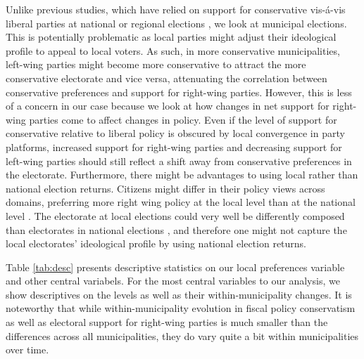 \documentclass[a4paper,12pt]{article}
\begin{document}
 Unlike previous studies, which have relied on support for conservative vis-á-vis liberal parties at national or regional elections \citep[e.g.,][]{hajnal2010or,einstein2016pushing}, we look at municipal elections. This is potentially problematic as local parties might adjust their ideological profile to appeal to local voters. As such, in more conservative municipalities, left-wing parties might become more conservative to attract the more conservative electorate and vice versa, attenuating the correlation between conservative preferences and support for right-wing parties. However, this is less of a concern in our case because we look at how changes in net support for right-wing parties come to affect changes in policy. Even if the level of support for conservative relative to liberal policy is obscured by local convergence in party platforms, increased support for right-wing parties and decreasing support for left-wing parties should still reflect a shift away from conservative preferences in the electorate. Furthermore, there might be advantages to using local rather than national election returns. Citizens might differ in their policy views across domains, preferring more right wing policy at the local level than at the national level \cite[for an argument along these lines, see][]{abrams2012big}. The electorate at local elections could very well be differently composed than electorates in national elections \citep{ansolabehere2015beyond}, and therefore one might not capture the local electorates' ideological profile by using national election returns.

Table \ref{tab:desc} presents descriptive statistics on our local preferences variable and other central variabels. For the most central variables to our analysis, we show descriptives on the levels as well as their within-municipality changes. It is noteworthy that while within-municipality evolution in fiscal policy conservatism as well as electoral support for right-wing parties is much smaller than the differences across all municipalities, they do vary quite a bit within municipalities over time.
\end{document}
